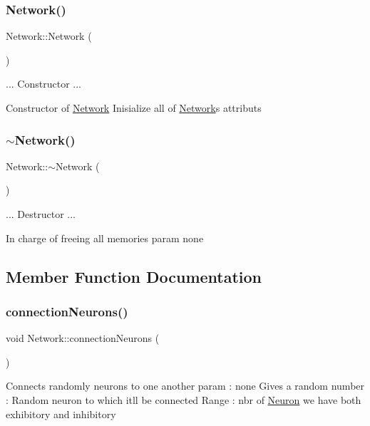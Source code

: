 \subsubsection{\texorpdfstring{Network()}{Network()}}
{\footnotesize\ttfamily Network\+::\+Network (\begin{DoxyParamCaption}{ }\end{DoxyParamCaption})}

... Constructor ...

Constructor of \hyperlink{class_network}{Network} Inisialize all of \hyperlink{class_network}{Network}\textquotesingle{}s attributs \mbox{\label{class_network_a7a4e19cdb4bf0c7ecf82baa643831492}} 
\subsubsection{\texorpdfstring{$\sim$\+Network()}{~Network()}}
{\footnotesize\ttfamily Network\+::$\sim$\+Network (\begin{DoxyParamCaption}{ }\end{DoxyParamCaption})}

... Destructor ...

In charge of freeing all memories param none 

\subsection{Member Function Documentation}
\mbox{\label{class_network_a431e2ab1f9bf907746583ac391832da3}} 
\subsubsection{\texorpdfstring{connection\+Neurons()}{connectionNeurons()}}
{\footnotesize\ttfamily void Network\+::connection\+Neurons (\begin{DoxyParamCaption}{ }\end{DoxyParamCaption})}

Connects randomly neurons to one another param \+: \textquotesingle{}none\textquotesingle{} Gives a random number \+: Random neuron to which it\textquotesingle{}ll be connected Range \+: nbr of \hyperlink{class_neuron}{Neuron} we have both exhibitory and inhibitory \mbox{\label{class_network_a60cc1bdce0650a7f40dc450408a5eaf2}} 
